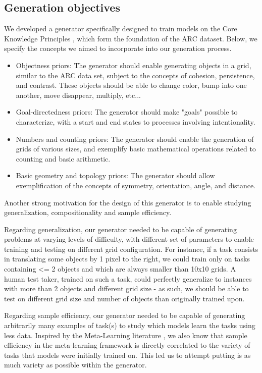 \subsection{Generation objectives}




We developed a generator specifically designed to train models on the Core Knowledge Principles \cite{cholletARC}, which form the foundation of the ARC dataset. Below, we specify the concepts we aimed to incorporate into our generation process.

\begin{itemize}
    \item Objectness priors:  The generator should enable generating objects in a grid, similar to the ARC data set, subject to the concepts of cohesion, persistence, and contrast. These objects should be able to change color, bump into one another, move disappear, multiply, etc...  
    \item Goal-directedness priors: The generator should make "goals" possible to characterize, with a start and end states to processes involving intentionality. 
    \item Numbers and counting priors: The generator should enable the generation of grids of various sizes, and exemplify basic mathematical operations related to counting and basic arithmetic. 
    \item Basic geometry and topology priors: The generator should allow exemplification of the concepts of symmetry, orientation, angle, and distance. 
\end{itemize}

Another strong motivation for the design of this generator is to enable studying generalization, compositionality and sample efficiency. 

Regarding generalization, our generator needed to be capable of generating problems at varying levels of difficulty, with different set of parameters to enable training and testing on different grid configuration. For instance, if a task consists in translating some objects by 1 pixel to the right, we could train only on tasks containing <= 2 objects and which are always smaller than 10x10 grids. A human test taker, trained on such a task, could perfectly generalize to instances with more than 2 objects and different grid size - as such, we should be able to test on different grid size and number of objects than originally trained upon. 

Regarding sample efficiency, our generator needed to be capable of generating arbitrarily many examples of task(s) to study which models learn the tasks using less data. Inspired by the Meta-Learning literature \cite{kirsch2022general}, we also know that sample efficiency in the meta-learning framework is directly correlated to the variety of tasks that models were initially trained on. This led us to attempt putting is as much variety as possible within the generator. 

